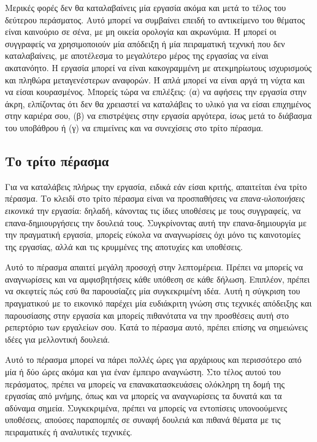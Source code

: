 \documentclass{article}
\begin{document}
\par
Μερικές φορές δεν θα καταλαβαίνεις μία εργασία ακόμα και μετά το τέλος του δεύτερου περάσματος. Αυτό μπορεί να συμβαίνει επειδή το αντικείμενο του θέματος είναι καινούριο σε σένα, με μη οικεία ορολογία και ακρωνύμια. Ή μπορεί οι συγγραφείς να χρησιμοποιούν μία απόδειξη ή μία πειραματική τεχνική που δεν καταλαβαίνεις, με αποτέλεσμα το μεγαλύτερο μέρος της εργασίας να είναι ακατανόητο. Η εργασία μπορεί να είναι κακογραμμένη με ατεκμηρίωτους ισχυρισμούς και πληθώρα μεταγενέστερων αναφορών. Ή απλά μπορεί να είναι αργά τη νύχτα και να είσαι κουρασμένος. Μπορείς τώρα να επιλέξεις: (α) να αφήσεις την εργασία στην άκρη, ελπίζοντας ότι δεν θα χρειαστεί να καταλάβεις το υλικό για να είσαι επιχημένος στην καριέρα σου, (β) να επιστρέψεις στην εργασία αργότερα, ίσως μετά το διάβασμα του υποβάθρου ή (γ) να επιμείνεις και να συνεχίσεις στο τρίτο πέρασμα.
\subsection{Το τρίτο πέρασμα}
\par
Για να καταλάβεις πλήρως την εργασία, ειδικά εάν είσαι κριτής, απαιτείται ένα τρίτο πέρασμα. Το κλειδί στο τρίτο πέρασμα είναι να προσπαθήσεις να \textit{επανα-υλοποιήσεις εικονικά} την εργασία: δηλαδή, κάνοντας τις ίδιες υποθέσεις με τους συγγραφείς, να επανα-δημιουργήσεις την δουλειά τους. Συγκρίνοντας αυτή την επανα-δημιουργία με την πραγματική εργασία, μπορείς εύκολα να αναγνωρίσεις όχι μόνο τις καινοτομίες της εργασίας, αλλά και τις κρυμμένες της αποτυχίες και υποθέσεις.
\par
Αυτό το πέρασμα απαιτεί μεγάλη προσοχή στην λεπτομέρεια. Πρέπει να μπορείς να αναγνωρίσεις και να αμφισβητήσεις κάθε υπόθεση σε κάθε δήλωση. Επιπλέον, πρέπει να σκεφτείς πώς εσύ θα παρουσίαζες μία συγκεκριμένη ιδέα. Αυτή η σύγκριση του πραγματικού με το εικονικό παρέχει μία ευδιάκριτη γνώση στις τεχνικές απόδειξης και παρουσίασης στην εργασία και μπορείς πιθανότατα να την προσθέσεις αυτή στο ρεπερτόριο των εργαλείων σου. Κατά το πέρασμα αυτό, πρέπει επίσης να σημειώνεις ιδέες για μελλοντική δουλειά.
\par
Αυτό το πέρασμα μπορεί να πάρει πολλές ώρες για αρχάριους και περισσότερο από μία ή δύο ώρες ακόμα και για έναν έμπειρο αναγνώστη. Στο τέλος αυτού του περάσματος, πρέπει να μπορείς να επανακατασκευάσεις ολόκληρη τη δομή της εργασίας από μνήμης, όπως και να μπορείς να αναγνωρίσεις τα δυνατά και τα αδύναμα σημεία. Συγκεκριμένα, πρέπει να μπορείς να εντοπίσεις υπονοούμενες υποθέσεις, απούσες παραπομπές σε συναφή δουλειά και πιθανά θέματα με τις πειραματικές ή αναλυτικές τεχνικές.
\end{document}
